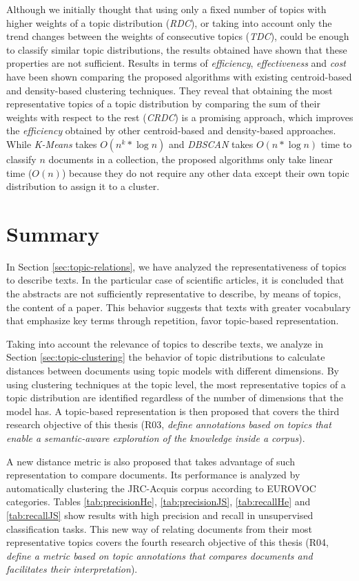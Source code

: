 Although we initially thought that using only a fixed number of topics with higher weights of a topic distribution (\textit{RDC}), or taking into account only the trend changes between the weights of consecutive topics (\textit{TDC}), could be enough to classify similar topic distributions, the results obtained have shown that these properties are not sufficient. Results in terms of \textit{efficiency}, \textit{effectiveness} and \textit{cost} have been shown comparing the proposed algorithms with existing centroid-based and density-based clustering techniques. They reveal that obtaining the most representative topics of a topic distribution  by comparing the sum of their weights with respect to the rest (\textit{CRDC}) is a promising approach, which improves the \textit{efficiency} obtained by other centroid-based and density-based approaches. While \textit{K-Means} takes $O(n^k * \log{n})$ and \textit{DBSCAN} takes $O(n * \log{n})$ time to classify $n$ documents in a collection, the proposed algorithms only take linear time ($O(n)$) because they do not require any other data except their own topic distribution to assign it to a cluster.


\section{Summary}

In Section \ref{sec:topic-relations}, we have analyzed the representativeness of topics to describe texts. In the particular case of scientific articles, it is concluded that the abstracts are not sufficiently representative to describe, by means of topics, the content of a paper. This behavior suggests that texts with greater vocabulary that emphasize key terms through repetition, favor topic-based representation.

Taking into account the relevance of topics to describe texts, we analyze in Section {\ref{sec:topic-clustering}} the behavior of topic distributions to calculate distances between documents using topic models with different dimensions. By using clustering techniques at the topic level, the most representative topics of a topic distribution are identified regardless of the number of dimensions that the model has. A topic-based representation is then proposed that covers the third research objective of this thesis (R03, \textit{define annotations based on topics that enable a semantic-aware exploration of the knowledge inside a corpus}). 

A new distance metric is also proposed that takes advantage of such representation to compare documents. Its performance is analyzed by automatically clustering the JRC-Acquis corpus according to EUROVOC categories. Tables \ref{tab:precisionHe}, \ref{tab:precisionJS}, \ref{tab:recallHe} and \ref{tab:recallJS} show results with high precision and recall in unsupervised classification tasks. This new way of relating documents from their most representative topics covers the fourth research objective of this thesis (R04, \textit{define a metric based on topic annotations that compares documents and facilitates their interpretation}). 

